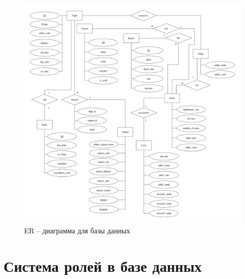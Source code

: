 \begin{figure}[H]
    \centering
    \includegraphics[scale=0.45]{inc/Drawing1}
    \caption{ER -- диаграмма для базы данных}
    \label{fig:er}
\end{figure}

\section{Система ролей в базе данных}

